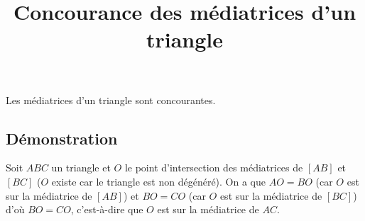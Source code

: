 \documentclass[fontsize=12pt,twoside=false,parskip=half,french]{scrartcl}
\title{Concourance des médiatrices d'un triangle}
\date{}
\author{}
\begin{document}
\maketitle
   \begin{Theoreme}
      Les médiatrices d'un triangle sont concourantes.
   \end{Theoreme}
   \subsection{Démonstration}
      Soit $ABC$ un triangle et $O$ le point d'intersection des médiatrices de
      $[AB]$ et $[BC]$ ($O$ existe car le triangle est non dégénéré). On a 
      que $AO = BO$ (car $O$ est sur la médiatrice de $[AB]$) et $BO = CO$
      (car $O$ est sur la médiatrice de $[BC]$) d'où $BO = CO$, c'est-à-dire
      que $O$ est sur la médiatrice de $AC$. 
\end{document}
